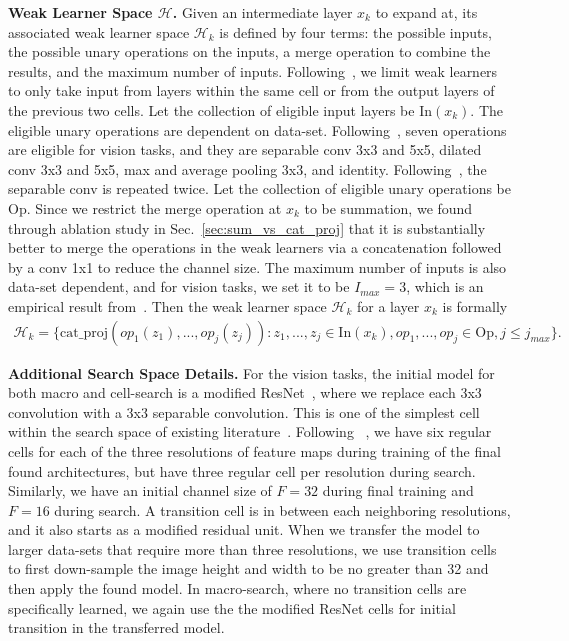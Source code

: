 \textbf{Weak Learner Space $\mathcal{H}$.}
Given an intermediate layer $x_{k}$ to expand at, its associated weak learner space $\mathcal{H}_{k}$ is defined by four terms: the possible inputs, the
possible unary operations on the inputs, a merge operation to combine the results, and the maximum number of inputs. 
Following~\citep{NASCell,Real2018RegularizedEF,Liu2018DARTSDA}, we limit weak learners to only take input from layers within the same cell or from the output layers of the previous 
two cells. Let the collection of eligible input layers be $\text{In}(x_{k})$. 
The eligible unary operations are dependent on data-set. Following~\citep{Liu2018DARTSDA}, seven operations are eligible for vision tasks, and they are
separable conv 3x3 and 5x5, dilated conv 3x3 and 5x5, max and average pooling 3x3, and identity. Following~\citep{NASCell,Real2018RegularizedEF}, the separable conv is 
repeated twice. Let the collection of eligible unary operations be $\text{Op}$.
Since we restrict the merge operation at $x_{k}$ to be summation, we found through ablation study in Sec.~\ref{sec:sum_vs_cat_proj} that
it is substantially better to merge the operations in the weak learners via a concatenation followed by a conv 1x1 to reduce the channel size. 
The maximum number of inputs is also data-set dependent, and for vision tasks, we set it to be $I_{max} = 3$, which is an empirical result from~\citep{darts_gumbel}.
Then the weak learner space $\mathcal{H}_{k}$ for a layer $x_{k}$ is formally 
\begin{align}
\mathcal{H}_{k} = \{ \text{cat\_proj}( op_1(z_1), ..., op_{j}(z_{j})) : z_1, ..., z_j \in \text{In}(x_{k}), op_1, ..., op_j \in \text{Op}, j \leq j_{max}  \}.
\end{align}



\textbf{Additional Search Space Details.}
For the vision tasks, the initial model for both macro and cell-search is a modified ResNet~\citep{resnet}, where we replace each 3x3 convolution with a 3x3 separable convolution. This is one of the simplest cell within the search space of existing literature~\citep{NASCell,Pham2018EfficientNA,Liu2018DARTSDA}.  Following ~\citep{NASCell}, we have six regular cells for each of the three resolutions of feature maps during training of the final found architectures, 
but have three regular cell per resolution during search. Similarly, we have an initial channel size of $F=32$ during final training and $F=16$ during search. 
A transition cell is in between each neighboring resolutions, and it also starts as a modified residual unit. 
When we transfer the model to larger data-sets that require more than three resolutions, we use transition cells to first down-sample the image height and width to be no greater than 32 and then apply the found model. In macro-search, where no transition cells are specifically learned, we again use the the modified ResNet cells for initial transition in the transferred model.


